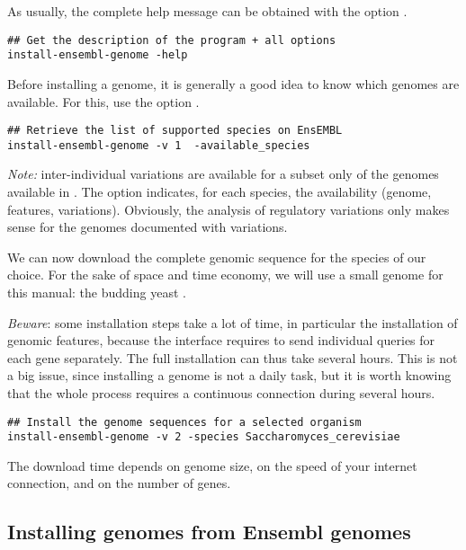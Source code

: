 As usually, the complete help message can be obtained with the option
.

\begin{lstlisting}
## Get the description of the program + all options
install-ensembl-genome -help
\end{lstlisting}

Before installing a genome, it is generally a good idea to know which
genomes are available. For this, use the option
.

\begin{lstlisting}
## Retrieve the list of supported species on EnsEMBL
install-ensembl-genome -v 1  -available_species
\end{lstlisting}

\emph{Note:} inter-individual variations are available for a subset
only of the genomes available in \ensembl. The option
 indicates, for each species, the
availability (genome, features, variations). Obviously, the analysis
of regulatory variations only makes sense for the genomes documented
with variations.

We can now download the complete genomic sequence for the species of
our choice. For the sake of space and time economy, we will use a
small genome for this manual: the budding yeast . 

\emph{Beware}: some installation steps take a lot of time, in
particular the installation of genomic features, because the \ensembl
interface requires to send individual queries for each gene
separately. The full installation can thus take several hours. This is
not a big issue, since installing a genome is not a daily task, but it
is worth knowing that the whole process requires a continuous
connection during several hours.

\begin{lstlisting}
## Install the genome sequences for a selected organism
install-ensembl-genome -v 2 -species Saccharomyces_cerevisiae
\end{lstlisting}

The download time depends on genome size, on the speed of your
internet connection, and on the number of genes.

\subsection{Installing genomes from Ensembl genomes}

